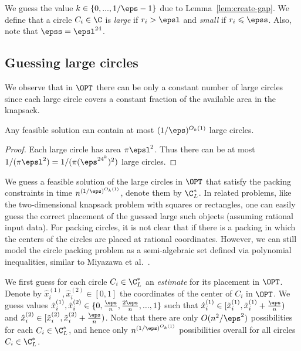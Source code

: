 We guess the value $k\in\{0,...,1/\eps-1\}$ due to Lemma~\ref{lem:create-gap}.
We define that a circle $C_{i}\in\C$ is \emph{large }if $r_{i}>\epsl$
and \emph{small} if $r_{i}\leqslant\epss$. Also, note that $\epss = \epsl^{24}$. 

\subsection{Guessing large circles} \label{subsec:Large_Guess}

We observe that in $\OPT$ there can be only a constant number of
large circles since each large circle covers a constant fraction of the
available area in the knapsack. 
\begin{prop}
\label{big_sol} Any feasible solution
	can contain at most $(1/\eps)^{O_k(1)}$ large circles. 
	\end{prop}

\begin{proof}
	Each large circle has area $\pi \epsl^2$. Thus there can be at most $1/(\pi \epsl^2)= 1/(\pi ({\eps^{{24}^k})^2})$ large circles. 
\end{proof}

We guess a feasible solution of the large circles in $\OPT$ that satisfy the packing constraints in time $n^{(1/\eps)^{O_k(1)}}$,
denote them by $\C_{L}^{*}$. In related problems, like the two-dimensional
knapsack problem with squares or rectangles, one can easily guess
the correct placement of the guessed large such objects  
(assuming rational input data).
For packing circles, it is not clear that if there is a packing in which the
centers of the circles are placed at rational coordinates.
{However, we can still model the circle packing problem as a semi-algebraic set defined via polynomial inequalities, similar to Miyazawa et al.~\cite{MiyazawaPSSW16}.}


We first guess for each circle $C_{i}\in\C_{L}^{*}$
an \emph{estimate }for its placement in $\OPT$. Denote by $\hat{x}_{i}^{(1)},\hat{x}_{i}^{(2)}\in[0,1]$
the coordinates of the center of $C_{i}$ in $\OPT$. We guess values
$\tilde{x}_{i}^{(1)},\tilde{x}_{i}^{(2)}\in\{0,\frac{\eps}{n},\frac{2\eps}{n},...,1\}$
such that $\hat{x}_{i}^{(1)}\in[\tilde{x}_{i}^{(1)},\tilde{x}_{i}^{(1)}+\frac{\eps}{n})$
and $\hat{x}_{i}^{(2)}\in[\tilde{x}_{i}^{(2)},\tilde{x}_{i}^{(2)}+\frac{\eps}{n})$.
Note that there are only $O(n^{2}/\eps^{2})$ possibilities for
each $C_{i}\in\C_{L}^{*}$, and hence only $n^{(1/\eps)^{O_k(1)}}$
possibilities overall for all circles $C_{i}\in\C_{L}^{*}$.

